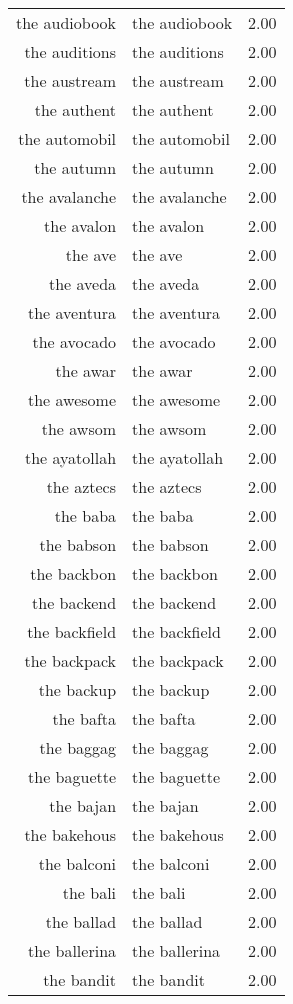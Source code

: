 \begin{table}[ht]
\begin{tabular}{rlr}
  the audiobook & the audiobook & 2.00 \\ 
  the auditions & the auditions & 2.00 \\ 
  the austream & the austream & 2.00 \\ 
  the authent & the authent & 2.00 \\ 
  the automobil & the automobil & 2.00 \\ 
  the autumn & the autumn & 2.00 \\ 
  the avalanche & the avalanche & 2.00 \\ 
  the avalon & the avalon & 2.00 \\ 
  the ave & the ave & 2.00 \\ 
  the aveda & the aveda & 2.00 \\ 
  the aventura & the aventura & 2.00 \\ 
  the avocado & the avocado & 2.00 \\ 
  the awar & the awar & 2.00 \\ 
  the awesome & the awesome & 2.00 \\ 
  the awsom & the awsom & 2.00 \\ 
  the ayatollah & the ayatollah & 2.00 \\ 
  the aztecs & the aztecs & 2.00 \\ 
  the baba & the baba & 2.00 \\ 
  the babson & the babson & 2.00 \\ 
  the backbon & the backbon & 2.00 \\ 
  the backend & the backend & 2.00 \\ 
  the backfield & the backfield & 2.00 \\ 
  the backpack & the backpack & 2.00 \\ 
  the backup & the backup & 2.00 \\ 
  the bafta & the bafta & 2.00 \\ 
  the baggag & the baggag & 2.00 \\ 
  the baguette & the baguette & 2.00 \\ 
  the bajan & the bajan & 2.00 \\ 
  the bakehous & the bakehous & 2.00 \\ 
  the balconi & the balconi & 2.00 \\ 
  the bali & the bali & 2.00 \\ 
  the ballad & the ballad & 2.00 \\ 
  the ballerina & the ballerina & 2.00 \\ 
  the bandit & the bandit & 2.00 \\ 

\end{tabular}
\end{table}

